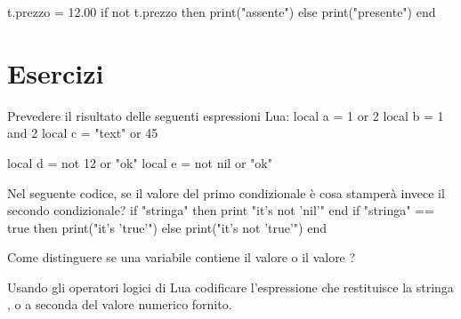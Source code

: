 t.prezzo = 12.00
if not t.prezzo then
    print("assente")
else
    print("presente")
end
\endlines
{}


\section{Esercizi}

\begin{Exercise}[label=oplogic-01]
Prevedere il risultato delle seguenti espressioni Lua:
\lines
local a = 1 or 2
local b = 1 and 2
local c = "text" or 45

local d = not 12 or "ok"
local e = not nil or "ok"
\endlines
{}
\end{Exercise}

\begin{Exercise}[label=oplogic-02]
Nel seguente codice, se il valore del primo condizionale è  cosa
stamperà invece il secondo condizionale?
\lines
if "stringa" then print "it's not 'nil'" end
if "stringa" == true then
    print("it's 'true'")
else
    print("it's not 'true'")
end
\endlines
{}
\end{Exercise}

\begin{Exercise}[label=oplogic-03]
Come distinguere se una variabile contiene il valore  o il valore
?  
\end{Exercise}

\begin{Exercise}[label=oplogic-04]
Usando gli operatori logici di Lua codificare l'espressione che restituisce
la stringa ,  o  a seconda del valore numerico fornito.
\end{Exercise}




